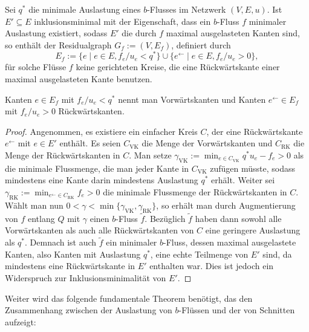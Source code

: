 \begin{lemma}\label{lemma-no-circle-in-res-graph-inclus-min}
	Sei $q^*$ die minimale Auslastung eines $b$-Flusses im Netzwerk $(V, E, u)$.
	Ist $E'\subseteq E$ inklusionsminimal mit der Eigenschaft, dass ein $b$-Fluss $f$ minimaler Auslastung existiert, sodass $E'$ die durch $f$ maximal ausgelasteten Kanten sind, so enthält der Residualgraph $G_f := (V, E_f)$, definiert durch \[
		E_f := \{ e \mid e\in E, f_e/u_e < q^* \} \cup \{ e^\leftarrow \mid e\in E, f_e/u_e > 0 \},
	\]
	für solche Flüsse $f$ keine gerichteten Kreise, die eine Rückwärtskante einer maximal ausgelasteten Kante benutzen.
	
	Kanten $e\in E_f$ mit $f_e/u_e < q^*$ nennt man Vorwärtskanten und Kanten $e^\leftarrow\in E_f$ mit $f_e/u_e > 0$ Rückwärtskanten.
\end{lemma}
\begin{proof}
	\newcommand{\VK}{\text{VK}}
	\newcommand{\RK}{\text{RK}}
	Angenommen, es existiere ein einfacher Kreis $C$, der eine Rückwärtskante $e^\leftarrow$ mit $e\in E'$ enthält.
	Es seien $C_\VK$ die Menge der Vorwärtskanten und $C_\RK$ die Menge der Rückwärtskanten in $C$.
	Man setze $\gamma_\VK := \min_{e\in C_\VK} q^*u_e - f_e > 0$ als die minimale Flussmenge, die man jeder Kante in $C_\VK$ zufügen müsste, sodass mindestens eine Kante darin mindestens Auslastung $q^*$ erhält.
	Weiter sei $\gamma_\RK := \min_{e^\leftarrow\in C_\RK} f_e > 0$ die minimale Flussmenge der Rückwärtskanten in $C$.
	Wählt man nun $0 < \gamma < \min\{ \gamma_\VK, \gamma_\RK  \}$, so erhält man durch Augmentierung von $f$ entlang $Q$ mit $\gamma$ einen $b$-Fluss $\tilde{f}$.
	Bezüglich $\tilde{f}$ haben dann sowohl alle Vorwärtskanten als auch alle Rückwärtskanten von $C$ eine geringere Auslastung als $q^*$.
	Demnach ist auch $\tilde{f}$ ein minimaler $b$-Fluss, dessen maximal ausgelastete Kanten, also Kanten mit Auslastung $q^*$, eine echte Teilmenge von $E'$ sind, da mindestens eine Rückwärtskante in $E'$ enthalten war.
	Dies ist jedoch ein Widerspruch zur Inklusionsminimalität von $E'$.
\end{proof}

Weiter wird das folgende fundamentale Theorem benötigt, das den Zusammenhang zwischen der Auslastung von $b$-Flüssen und der von Schnitten aufzeigt:

